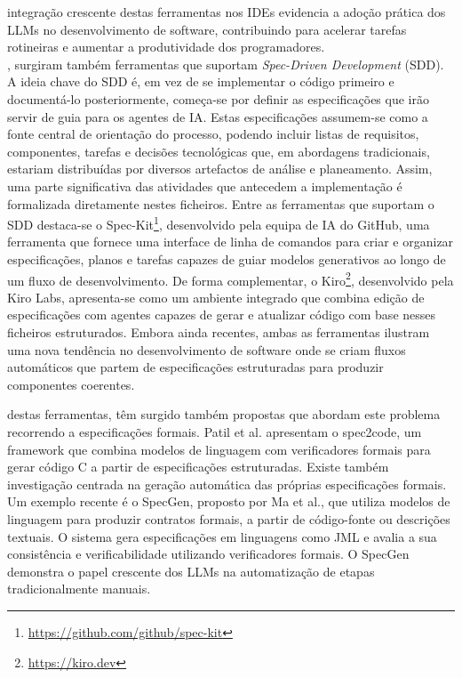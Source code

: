  integração crescente destas ferramentas nos IDEs evidencia a adoção prática dos LLMs no desenvolvimento de software, contribuindo para acelerar tarefas rotineiras e aumentar a produtividade dos programadores\cite{CopilotRole}.\\

, surgiram também ferramentas que suportam \textit{Spec-Driven Development} (SDD). A ideia chave do SDD é, em vez de se implementar o código primeiro e documentá-lo posteriormente, começa-se por definir as especificações que irão servir de guia para os agentes de IA. Estas especificações assumem-se como a fonte central de orientação do processo, podendo incluir listas de requisitos, componentes, tarefas e decisões tecnológicas que, em abordagens tradicionais, estariam distribuídas por diversos artefactos de análise e planeamento. Assim, uma parte significativa das atividades que antecedem a implementação é formalizada diretamente nestes ficheiros. Entre as ferramentas que suportam o SDD destaca-se o Spec-Kit\footnote{\href{https://github.com/github/spec-kit}{https://github.com/github/spec-kit}}, desenvolvido pela equipa de IA do GitHub, uma ferramenta que fornece uma interface de linha de comandos para criar e organizar especificações, planos e tarefas capazes de guiar modelos generativos ao longo de um fluxo de desenvolvimento. De forma complementar, o Kiro\footnote{\href{https://kiro.dev}{https://kiro.dev}}, desenvolvido pela Kiro Labs, apresenta-se como um ambiente integrado que combina edição de especificações com agentes capazes de gerar e atualizar código com base nesses ficheiros estruturados. Embora ainda recentes, ambas as ferramentas ilustram uma nova tendência no desenvolvimento de software onde se criam fluxos automáticos que partem de especificações estruturadas para produzir componentes coerentes.\par

 destas ferramentas, têm surgido também propostas que abordam este problema recorrendo a especificações formais. Patil et al.\cite{Spec2Code} apresentam o spec2code, um framework que combina modelos de linguagem com verificadores formais para gerar código C a partir de especificações estruturadas. Existe também investigação centrada na geração automática das próprias especificações formais. Um exemplo recente é o SpecGen, proposto por Ma et al.\cite{SpecGen}, que utiliza modelos de linguagem para produzir contratos formais, a partir de código-fonte ou descrições textuais. O sistema gera especificações em linguagens como JML\cite{JML} e avalia a sua consistência e verificabilidade utilizando verificadores formais. O SpecGen demonstra o papel crescente dos LLMs na automatização de etapas tradicionalmente manuais.\\\par

